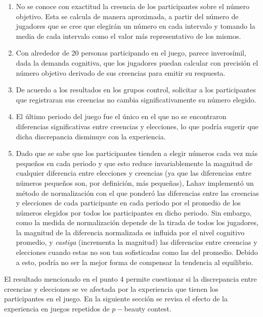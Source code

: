 \begin{enumerate}
\item No se conoce con exactitud la creencia de los participantes sobre el número objetivo. Esta se calcula de manera aproximada, a partir del número de jugadores que se cree que elegirán un número en cada intervalo y tomando la media de cada intervalo como el valor más representativo de los mismos.\\

\item Con alrededor de 20 personas participando en el juego, parece inverosímil, dada la demanda cognitiva, que los jugadores puedan calcular con precisión el número objetivo derivado de sus creencias para emitir su respuesta.\\

\item De acuerdo a los resultados en los grupos control, solicitar a los participantes que registraran sus creencias no cambia significativamente  su número elegido.\\

\item El último periodo del juego fue el único en el que no se encontraron diferencias significativas entre creencias y elecciones, lo que podría sugerir que dicha discrepancia disminuye con la experiencia.\\

\item Dado que se sabe que los participantes tienden a elegir números cada vez más pequeños en cada periodo y que esto reduce invariablemente la magnitud de cualquier diferencia entre elecciones y creencias (ya que las diferencias entre números pequeños son, por definición, más pequeñas), Lahav implementó un método de normalización con el que ponderó las diferencias entre las creencias y elecciones de cada participante en cada periodo por el promedio de los números elegidos por todos los participantes en dicho periodo. Sin embargo, como la medida de normalización depende de la tirada de todos los jugadores, la magnitud de la diferencia normalizada es influida por el nivel cognitivo promedio, y \textit{castiga} (incrementa la magnitud) las diferencias entre creencias y elecciones cuando estas no son tan sofisticadas como las del promedio. Debido a esto, podría no ser la mejor forma de compensar la tendencia al equilibrio.\\
\end{enumerate}

El resultado mencionado en el punto 4 permite cuestionar si la discrepancia entre creencias y elecciones se ve afectada por la experiencia que tienen los participantes en el juego.  En la siguiente sección se revisa el efecto de la experiencia en juegos repetidos de $p-$beauty contest.\\

